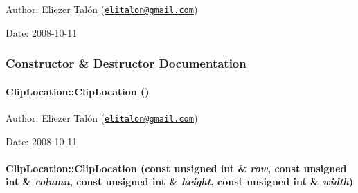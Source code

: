 \begin{Desc}
\item[Author:]Eliezer Talón (\href{mailto:elitalon@gmail.com}{\tt elitalon@gmail.com}) \end{Desc}
\begin{Desc}
\item[Date:]2008-10-11 \end{Desc}


\subsubsection{Constructor \& Destructor Documentation}
\hypertarget{class_clip_location_fb51ec03e0a8f9b33f4d785550bc6b84}{
\paragraph[{ClipLocation}]{\setlength{\rightskip}{0pt plus 5cm}ClipLocation::ClipLocation ()}\hfill}
\label{class_clip_location_fb51ec03e0a8f9b33f4d785550bc6b84}


\begin{Desc}
\item[Author:]Eliezer Talón (\href{mailto:elitalon@gmail.com}{\tt elitalon@gmail.com}) \end{Desc}
\begin{Desc}
\item[Date:]2008-10-11 \end{Desc}
\hypertarget{class_clip_location_b41ff36c161d2d909c6e75474f5f2f31}{
\paragraph[{ClipLocation}]{\setlength{\rightskip}{0pt plus 5cm}ClipLocation::ClipLocation (const unsigned int \& {\em row}, \/  const unsigned int \& {\em column}, \/  const unsigned int \& {\em height}, \/  const unsigned int \& {\em width})}\hfill}
\label{class_clip_location_b41ff36c161d2d909c6e75474f5f2f31}


